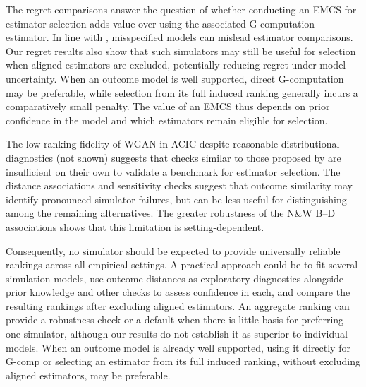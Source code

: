The regret comparisons answer the question of whether conducting an EMCS for estimator selection adds value over using the associated G-computation estimator. In line with , misspecified models can mislead estimator comparisons. Our regret results also show that such simulators may still be useful for selection when aligned estimators are excluded, potentially reducing regret under model uncertainty. When an outcome model is well supported, direct G-computation may be preferable, while selection from its full induced ranking generally incurs a comparatively small penalty. The value of an EMCS thus depends on prior confidence in the model and which estimators remain eligible for selection.

The low ranking fidelity of WGAN in ACIC despite reasonable distributional diagnostics (not shown) suggests that checks similar to those proposed by  are insufficient on their own to validate a benchmark for estimator selection. The distance associations and sensitivity checks suggest that outcome similarity may identify pronounced simulator failures, but can be less useful for distinguishing among the remaining alternatives. The greater robustness of the N\&W B--D associations shows that this limitation is setting-dependent.

Consequently, no simulator should be expected to provide universally reliable rankings across all empirical settings. A practical approach could be to fit several simulation models, use outcome distances as exploratory diagnostics alongside prior knowledge and other checks to assess confidence in each, and compare the resulting rankings after excluding aligned estimators. An aggregate ranking can provide a robustness check or a default when there is little basis for preferring one simulator, although our results do not establish it as superior to individual models. When an outcome model is already well supported, using it directly for G-comp or selecting an estimator from its full induced ranking, without excluding aligned estimators, may be preferable.

